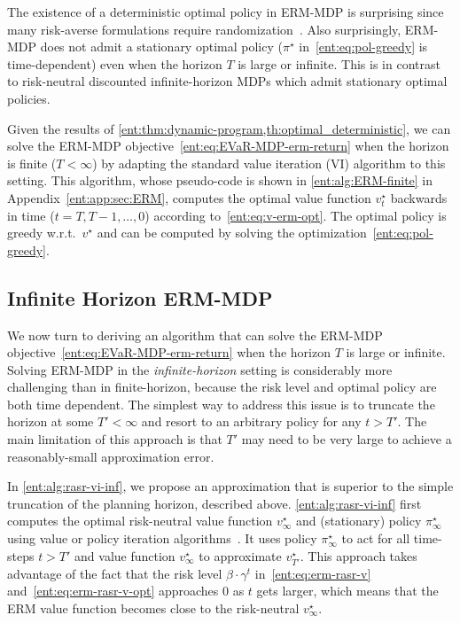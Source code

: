 \documentclass[twoside]{article}
\newcommand{\opt}{^\star}
\theoremstyle{plain}
\theoremstyle{definition}
\theoremstyle{remark}
\renewcommand{\cite}[1]{\citep{#1}}
\begin{document}
The existence of a deterministic optimal policy in ERM-MDP is surprising since many risk-averse formulations require randomization~\cite{Delage2019,Lobo2021,Steimle2021a}. Also surprisingly, ERM-MDP does not admit a stationary optimal policy ($\pi^\star$ in~\eqref{ent:eq:pol-greedy} is time-dependent) even when the horizon $T$ is large or infinite. This is in contrast to risk-neutral discounted infinite-horizon MDPs which admit stationary optimal policies.

Given the results of \cref{ent:thm:dynamic-program,th:optimal_deterministic}, we can solve the ERM-MDP objective~\eqref{ent:eq:EVaR-MDP-erm-return} when the horizon is finite ($T<\infty$) by adapting the standard value iteration (VI) algorithm to this setting. This algorithm, whose pseudo-code is shown in \cref{ent:alg:ERM-finite} in Appendix~\ref{ent:app:sec:ERM}, computes the optimal value function $v\opt_t$ backwards in time ($t = T,T-1,\ldots,0$) according to~\eqref{ent:eq:v-erm-opt}. The optimal policy is greedy w.r.t.~$v\opt$ and can be computed by solving the optimization~\eqref{ent:eq:pol-greedy}.


\subsection{Infinite Horizon ERM-MDP}
\label{ent:subsec:VI-ERM-MDP}

We now turn to deriving an algorithm that can solve the ERM-MDP objective~\eqref{ent:eq:EVaR-MDP-erm-return} when the horizon $T$ is large or infinite. Solving ERM-MDP in the \emph{infinite-horizon} setting is considerably more challenging than in finite-horizon, because the risk level and optimal policy are both time dependent. The simplest way to address this issue is to truncate the horizon at some $T' < \infty$ and resort to an arbitrary policy for any $t > T'$. The main limitation of this approach is that $T'$ may need to be very large to achieve a reasonably-small approximation error. 

In \cref{ent:alg:rasr-vi-inf}, we propose an approximation that is superior to the simple truncation of the planning horizon, described above. \cref{ent:alg:rasr-vi-inf} first computes the optimal risk-neutral value function $v_{\infty}\opt$ and (stationary) policy $\pi_{\infty}\opt$ using value or policy iteration algorithms~\cite{Puterman2005}. It uses policy $\pi_{\infty}\opt$ to act for all time-steps $t > T'$ and value function $v_{\infty}\opt$ to approximate $v\opt_{T'}$. This approach takes advantage of the fact that the risk level $\beta \cdot \gamma^t$ in~\eqref{ent:eq:erm-rasr-v} and~\eqref{ent:eq:erm-rasr-v-opt} approaches $0$ as $t$ gets larger, which means that the ERM value function becomes close to the risk-neutral $v_{\infty}\opt$.  
\end{document}
